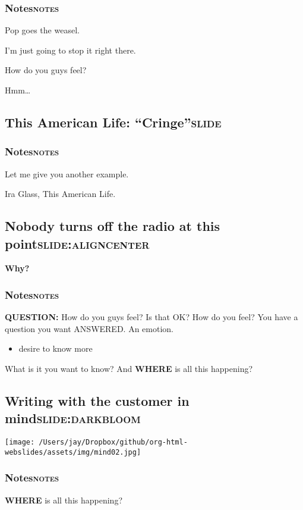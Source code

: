 \documentclass[11pt]{article}
\begin{document}
\subsubsection{Notes\hfill{}\textsc{notes}}
\label{sec:orge5c9558}
Pop goes the weasel.

I'm just going to stop it right there.

How do you guys feel?

Hmm\ldots{}

\subsection{This American Life: ``Cringe''\hfill{}\textsc{slide}}
\label{sec:orgbbb759a}


\subsubsection{Notes\hfill{}\textsc{notes}}
\label{sec:orgca53c84}
Let me give you another example.

Ira Glass, This American Life.
\subsection{\textbf{Nobody} turns off the radio at this point\hfill{}\textsc{slide:aligncenter}}
\label{sec:org5b567d5}
\textbf{Why?}

\subsubsection{Notes\hfill{}\textsc{notes}}
\label{sec:org9494eb1}
\textbf{QUESTION:} How do you guys feel?
Is that OK?
How do you feel?
You have a question you want ANSWERED.
An emotion.
\begin{itemize}
\item desire to know more
\end{itemize}
What is it you want to know?
And \textbf{WHERE} is all this happening?

\subsection{Writing with the customer in mind\hfill{}\textsc{slide:darkbloom}}
\label{sec:orgd2c7eb3}
\begin{center}
\texttt{[image: /Users/jay/Dropbox/github/org-html-webslides/assets/img/mind02.jpg]}
\end{center}

\subsubsection{Notes\hfill{}\textsc{notes}}
\label{sec:org19f0577}
\textbf{WHERE} is all this happening?
\end{document}
